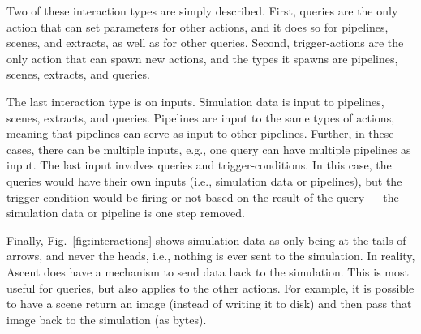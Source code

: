 Two of these interaction types are simply described.
%
First, queries are the only action that can set parameters for other actions, and it does so for
pipelines, scenes, and extracts, as well as for other queries.
%
Second, trigger-actions are the only action that can spawn new actions, and the types it spawns are
pipelines, scenes, extracts, and queries.
%

The last interaction type is on inputs.
%
Simulation data is input to pipelines, scenes, extracts, and queries.
%
Pipelines are input to the same types of actions, meaning that pipelines can serve as input
to other pipelines.
%
Further, in these cases, there can be multiple inputs, e.g., one query can have multiple
pipelines as input.
%
The last input involves queries and trigger-conditions.
%
In this case, the queries would have their own inputs (i.e., simulation data or pipelines),
but the trigger-condition would be firing or not based on the result of the query ---
the simulation data or pipeline is one step removed.

Finally, Fig.~\ref{fig:interactions} shows simulation data as only being at the tails of arrows,
and never the heads, i.e., nothing is ever sent to the simulation.
%
In reality, Ascent does have a mechanism to send data back to the simulation.
%
This is most useful for queries, but also applies to the other actions.
%
For example, it is possible to have a scene return an image (instead of writing it to disk)
and then pass that image back to the simulation (as bytes).



